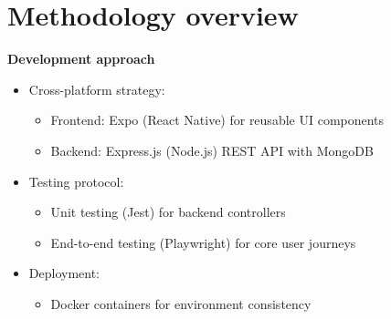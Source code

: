 \section{Methodology overview}

\textbf{Development approach}

\begin{itemize}
    \item Cross-platform strategy:
    \begin{itemize}
        \item Frontend: Expo (React Native) for reusable UI components
        \item Backend: Express.js (Node.js) REST API with MongoDB
    \end{itemize}
    
    \item Testing protocol:
    \begin{itemize}
        \item Unit testing (Jest) for backend controllers
        \item End-to-end testing (Playwright) for core user journeys
    \end{itemize}
    
    \item Deployment:
    \begin{itemize}
        \item Docker containers for environment consistency
    \end{itemize}
\end{itemize}
